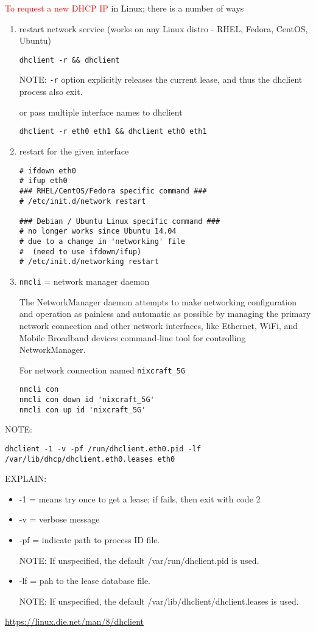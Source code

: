 \textcolor{red}{To request a new DHCP IP} in Linux; there is a number of ways
\begin{enumerate}
  \item restart network service (works on any Linux distro - RHEL, Fedora,
  CentOS, Ubuntu)

\begin{verbatim}
dhclient -r && dhclient
\end{verbatim}
NOTE: \verb!-r! option explicitly releases the current lease, and thus the
dhclient process also exit. 

or pass multiple interface names to dhclient
\begin{verbatim}
dhclient -r eth0 eth1 && dhclient eth0 eth1
\end{verbatim}

  \item restart for the given interface
\begin{verbatim}
# ifdown eth0
# ifup eth0
### RHEL/CentOS/Fedora specific command ###
# /etc/init.d/network restart

### Debian / Ubuntu Linux specific command ###
# no longer works since Ubuntu 14.04 
# due to a change in 'networking' file
#  (need to use ifdown/ifup)
# /etc/init.d/networking restart
\end{verbatim}

  \item \verb!nmcli! = network manager daemon
  
The NetworkManager daemon attempts to make networking configuration and
operation as painless and automatic as possible by managing the primary network
connection and other network interfaces, like Ethernet, WiFi, and Mobile
Broadband devices command-line tool for controlling NetworkManager.

For network connection named \verb!nixcraft_5G!
\begin{verbatim}
nmcli con
nmcli con down id 'nixcraft_5G'
nmcli con up id 'nixcraft_5G'
\end{verbatim}

\end{enumerate}

NOTE:
{\tiny
\begin{verbatim}
dhclient -1 -v -pf /run/dhclient.eth0.pid -lf /var/lib/dhcp/dhclient.eth0.leases eth0
\end{verbatim}
}
EXPLAIN:
\begin{itemize}
  \item -1 = means try once to get a lease; if fails, then exit with code 2
  
  \item -v = verbose message
  
  \item -pf = indicate path to process ID file.
  
NOTE: If unspecified, the default /var/run/dhclient.pid is used.

  \item -lf = pah to the lease database file. 
  
NOTE: If unspecified, the default /var/lib/dhclient/dhclient.leases is used.

\end{itemize}
\url{https://linux.die.net/man/8/dhclient}

